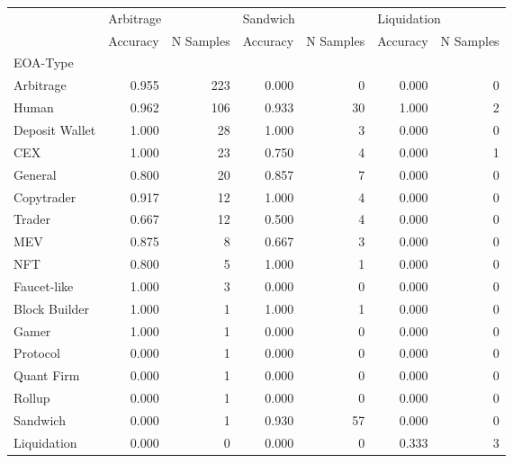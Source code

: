 \begin{tabular}{lrrrrrr}
\toprule
{} & \multicolumn{2}{l}{Arbitrage} & \multicolumn{2}{l}{Sandwich} & \multicolumn{2}{l}{Liquidation} \\
{} &  Accuracy & N Samples & Accuracy & N Samples &    Accuracy & N Samples \\
EOA-Type       &           &           &          &           &             &           \\
\midrule
Arbitrage      &     0.955 &       223 &    0.000 &         0 &       0.000 &         0 \\
Human          &     0.962 &       106 &    0.933 &        30 &       1.000 &         2 \\
Deposit Wallet &     1.000 &        28 &    1.000 &         3 &       0.000 &         0 \\
CEX            &     1.000 &        23 &    0.750 &         4 &       0.000 &         1 \\
General        &     0.800 &        20 &    0.857 &         7 &       0.000 &         0 \\
Copytrader     &     0.917 &        12 &    1.000 &         4 &       0.000 &         0 \\
Trader         &     0.667 &        12 &    0.500 &         4 &       0.000 &         0 \\
MEV            &     0.875 &         8 &    0.667 &         3 &       0.000 &         0 \\
NFT            &     0.800 &         5 &    1.000 &         1 &       0.000 &         0 \\
Faucet-like    &     1.000 &         3 &    0.000 &         0 &       0.000 &         0 \\
Block Builder  &     1.000 &         1 &    1.000 &         1 &       0.000 &         0 \\
Gamer          &     1.000 &         1 &    0.000 &         0 &       0.000 &         0 \\
Protocol       &     0.000 &         1 &    0.000 &         0 &       0.000 &         0 \\
Quant Firm     &     0.000 &         1 &    0.000 &         0 &       0.000 &         0 \\
Rollup         &     0.000 &         1 &    0.000 &         0 &       0.000 &         0 \\
Sandwich       &     0.000 &         1 &    0.930 &        57 &       0.000 &         0 \\
Liquidation    &     0.000 &         0 &    0.000 &         0 &       0.333 &         3 \\
\bottomrule
\end{tabular}

